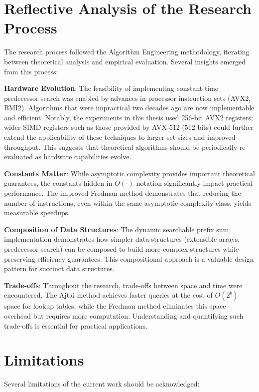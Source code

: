 \section{Reflective Analysis of the Research Process}

The research process followed the Algorithm Engineering methodology, iterating between theoretical analysis and empirical evaluation. Several insights emerged from this process:

\textbf{Hardware Evolution}: The feasibility of implementing constant-time predecessor search was enabled by advances in processor instruction sets (AVX2, BMI2). Algorithms that were impractical two decades ago are now implementable and efficient. Notably, the experiments in this thesis used 256-bit AVX2 registers; wider SIMD registers such as those provided by AVX-512 (512 bits) could further extend the applicability of these techniques to larger set sizes and improved throughput. This suggests that theoretical algorithms should be periodically re-evaluated as hardware capabilities evolve.

\textbf{Constants Matter}: While asymptotic complexity provides important theoretical guarantees, the constants hidden in $O(\cdot)$ notation significantly impact practical performance. The improved Fredman method demonstrates that reducing the number of instructions, even within the same asymptotic complexity class, yields measurable speedups.

\textbf{Composition of Data Structures}: The dynamic searchable prefix sum implementation demonstrates how simpler data structures (extensible arrays, predecessor search) can be composed to build more complex structures while preserving efficiency guarantees. This compositional approach is a valuable design pattern for succinct data structures.

\textbf{Trade-offs}: Throughout the research, trade-offs between space and time were encountered. The Ajtai method achieves faster queries at the cost of $O(2^b)$ space for lookup tables, while the Fredman method eliminates this space overhead but requires more computation. Understanding and quantifying such trade-offs is essential for practical applications.

\section{Limitations}

Several limitations of the current work should be acknowledged:

